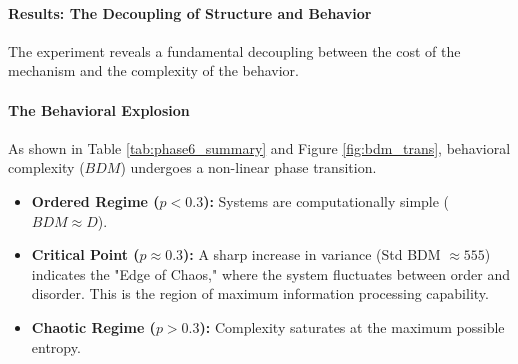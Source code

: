 \paragraph{Results: The Decoupling of Structure and Behavior}
The experiment reveals a fundamental decoupling between the cost of the mechanism and the complexity of the behavior.

\begin{table}[H]
\centering
\caption{Phase 6 Summary: The Algorithmic Phase Transition ($N=20$)}
\label{tab:phase6_summary}
\end{table}

\paragraph{The Behavioral Explosion}
As shown in Table \ref{tab:phase6_summary} and Figure \ref{fig:bdm_trans}, behavioral complexity ($BDM$) undergoes a non-linear phase transition.
\begin{itemize}
    \item \textbf{Ordered Regime ($p < 0.3$):} Systems are computationally simple ($BDM \approx D$).
    \item \textbf{Critical Point ($p \approx 0.3$):} A sharp increase in variance (Std BDM $\approx 555$) indicates the "Edge of Chaos," where the system fluctuates between order and disorder. This is the region of maximum information processing capability.
    \item \textbf{Chaotic Regime ($p > 0.3$):} Complexity saturates at the maximum possible entropy.
\end{itemize}

